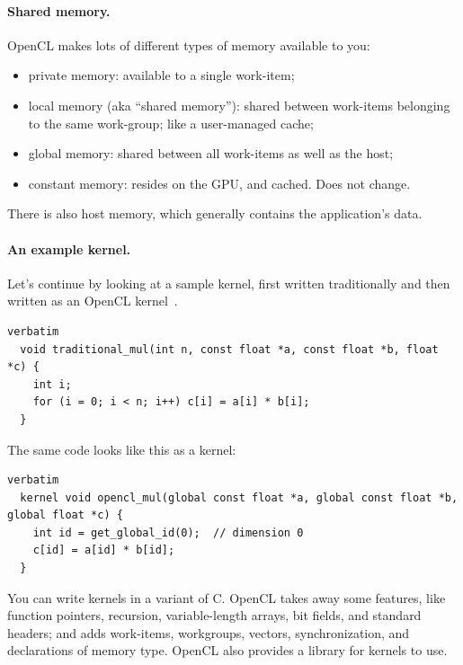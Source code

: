 \documentclass[a4paper]{report}
\begin{document}
\paragraph{Shared memory.} OpenCL makes lots of different types of
memory available to you:

\begin{itemize}
\item private memory: available to a single work-item;
\item local memory (aka ``shared memory''): shared between work-items
  belonging to the same work-group; like a user-managed cache;
\item global memory: shared between all work-items as well as the host;
\item constant memory: resides on the GPU, and cached. Does not change.
\end{itemize}

There is also host memory, which generally contains the application's
data.

\paragraph{An example kernel.} Let's continue by looking at 
a sample kernel, first written traditionally and then written
as an OpenCL kernel~\cite{khronos}.

{\scriptsize \hspace*{2em} \begin{minipage}{.8\textwidth} \begin{lstlisting}verbatim
  void traditional_mul(int n, const float *a, const float *b, float *c) {
    int i;
    for (i = 0; i < n; i++) c[i] = a[i] * b[i];
  }
    \end{lstlisting}
  \end{minipage}
  }

The same code looks like this as a kernel:

{\scriptsize \hspace*{1em} \begin{minipage}{.8\textwidth} \begin{lstlisting}verbatim
  kernel void opencl_mul(global const float *a, global const float *b, global float *c) {
    int id = get_global_id(0);  // dimension 0
    c[id] = a[id] * b[id];
  }
    \end{lstlisting}
  \end{minipage}
}

You can write kernels in a variant of C. OpenCL takes away some features,
like function pointers, recursion, variable-length arrays, bit fields,
and standard headers; and adds work-items, workgroups, vectors,
synchronization, and declarations of memory type. OpenCL also provides
a library for kernels to use.
\end{document}

